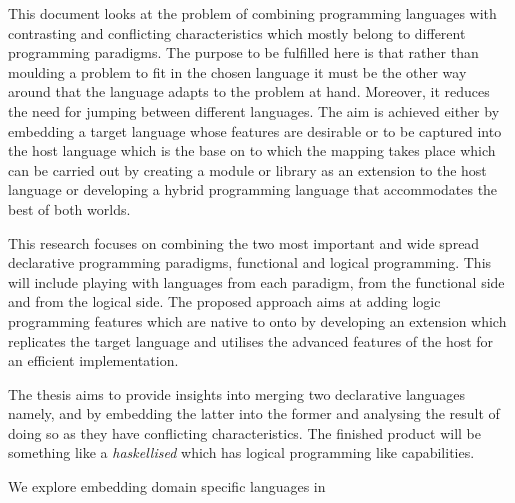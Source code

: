 

\begin{unbcabstract}

This document looks at the problem of combining programming languages with contrasting and conflicting 
characteristics which mostly belong to different pro\-gram\-ming pa\-ra\-digms. The purpose to be fulfilled here is that 
rather than moulding a problem to fit in the chosen language it must be the other way around that the language 
adapts to the problem at hand. Moreover, it reduces the need for jumping between different  languages. The aim is 
achieved either by embedding a target language  whose features are desirable or to be captured into the host 
language which is the base on to which the mapping takes place which can be carried out by creating a module or 
library as an extension to the host language or developing a hybrid programming language that accommodates the 
best of both worlds.  

This research focuses on combining the two most important and wide spread declarative programming paradigms, 
functional and logical programming. This will include playing with languages from each paradigm, 
 from the functional side and  from the logical side. The proposed approach 
aims at adding logic programming features which are native to  onto  by 
developing an extension which replicates the target language and utilises the advanced features of the host for an 
efficient implementation.      

The thesis  aims to provide insights into merging two declarative languages namely,  and
 by embedding the latter into the former and analysing the result of doing so as they have
conflicting characteristics.
The finished product will be something like a \textit{haskellised}  which has logical programming
like capabilities.

We explore embedding domain specific languages in 

       
\end{unbcabstract}

